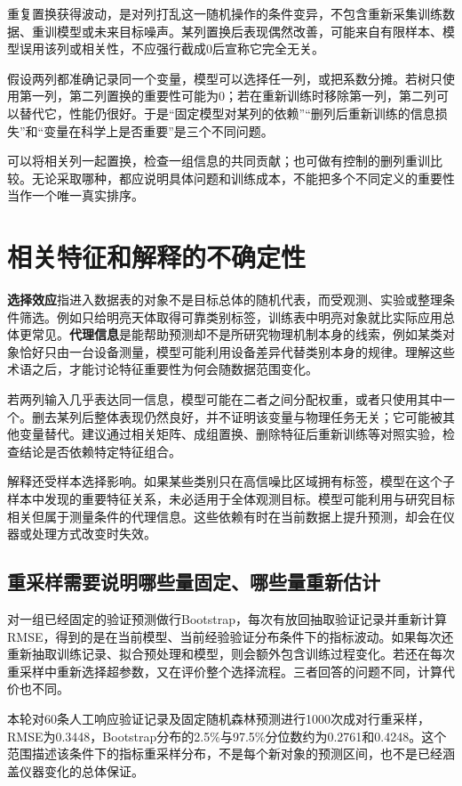 重复置换获得波动，是对列打乱这一随机操作的条件变异，不包含重新采集训练数据、重训模型或未来目标噪声。某列置换后表现偶然改善，可能来自有限样本、模型误用该列或相关性，不应强行截成0后宣称它完全无关。

假设两列都准确记录同一个变量，模型可以选择任一列，或把系数分摊。若树只使用第一列，第二列置换的重要性可能为0；若在重新训练时移除第一列，第二列可以替代它，性能仍很好。于是“固定模型对某列的依赖”“删列后重新训练的信息损失”和“变量在科学上是否重要”是三个不同问题。

可以将相关列一起置换，检查一组信息的共同贡献；也可做有控制的删列重训比较。无论采取哪种，都应说明具体问题和训练成本，不能把多个不同定义的重要性当作一个唯一真实排序。

\section{相关特征和解释的不确定性}

\textbf{选择效应}指进入数据表的对象不是目标总体的随机代表，而受观测、实验或整理条件筛选。例如只给明亮天体取得可靠类别标签，训练表中明亮对象就比实际应用总体更常见。\textbf{代理信息}是能帮助预测却不是所研究物理机制本身的线索，例如某类对象恰好只由一台设备测量，模型可能利用设备差异代替类别本身的规律。理解这些术语之后，才能讨论特征重要性为何会随数据范围变化。

若两列输入几乎表达同一信息，模型可能在二者之间分配权重，或者只使用其中一个。删去某列后整体表现仍然良好，并不证明该变量与物理任务无关；它可能被其他变量替代。建议通过相关矩阵、成组置换、删除特征后重新训练等对照实验，检查结论是否依赖特定特征组合。

解释还受样本选择影响。如果某些类别只在高信噪比区域拥有标签，模型在这个子样本中发现的重要特征关系，未必适用于全体观测目标。模型可能利用与研究目标相关但属于测量条件的代理信息。这些依赖有时在当前数据上提升预测，却会在仪器或处理方式改变时失效。

\subsection{重采样需要说明哪些量固定、哪些量重新估计}
对一组已经固定的验证预测做行Bootstrap，每次有放回抽取验证记录并重新计算RMSE，得到的是在当前模型、当前经验验证分布条件下的指标波动。如果每次还重新抽取训练记录、拟合预处理和模型，则会额外包含训练过程变化。若还在每次重采样中重新选择超参数，又在评价整个选择流程。三者回答的问题不同，计算代价也不同。

本轮对60条人工响应验证记录及固定随机森林预测进行1000次成对行重采样，RMSE为0.3448，Bootstrap分布的2.5\%与97.5\%分位数约为0.2761和0.4248。这个范围描述该条件下的指标重采样分布，不是每个新对象的预测区间，也不是已经涵盖仪器变化的总体保证。

